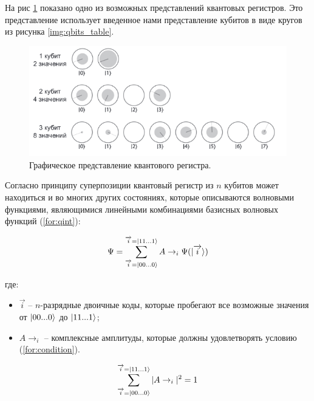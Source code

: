 На рис \ref{img:qint} показано одно из возможных представлений квантовых регистров. Это представление использует введенное нами представление кубитов в виде кругов из рисунка \ref{img:qbits_table}.

\begin{figure}[H]
	\begin{center}
		\includegraphics[scale=0.7]{img/qint.png}
	\end{center}
	\captionsetup{justification=centering}
	\caption{Графическое представление квантового регистра.}
	\label{img:qint}
\end{figure}

Согласно принципу суперпозиции квантовый регистр из $n$ кубитов может находиться и во многих других состояниях, которые описываются волновыми функциями, являющимися линейными комбинациями базисных волновых функций (\ref{for:qint}): 

\begin{equation} 
	\label{for:qint}
	\Psi = \sum\limits_{\overrightarrow{i}=\lvert00...0\rangle}^{\overrightarrow{i} = \lvert11...1\rangle} A \rightarrow_{i} \Psi(\lvert\overrightarrow{i}\rangle)
\end{equation}

где:

\begin{itemize}
	\item $\overrightarrow{i}$ -- $n$-разрядные двоичные коды, которые пробегают все возможные значения от $\lvert00...0\rangle$ до $\lvert11...1\rangle$;
	\item $A \rightarrow_{i}$ -- комплексные амплитуды, которые должны удовлетворять условию (\ref{for:condition}).
\end{itemize}

\begin{equation} 
	\label{for:condition}
	\sum\limits_{\overrightarrow{i}=\lvert00...0\rangle}^{\overrightarrow{i} = \lvert11...1\rangle} |A \rightarrow_{i}|^2 = 1
\end{equation}

